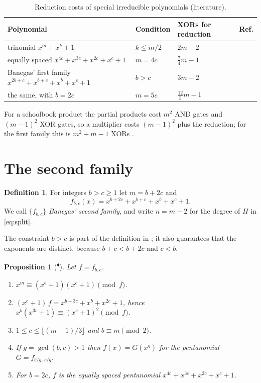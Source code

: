 \documentclass[11pt,a4paper]{article}
\theoremstyle{plain}
\newtheorem{proposition}[theorem]{Proposition}
\theoremstyle{definition}
\newtheorem{definition}[theorem]{Definition}
\newcommand{\ours}{\textsuperscript{\textcolor{cblue}{$\blacklozenge$}}}
\begin{document}
\begin{table}[t]
\centering\small
\caption{Reduction costs of special irreducible polynomials (literature).}
\label{tab:known}
\begin{tabular}{@{}l l l l@{}}
\toprule
Polynomial & Condition & XORs for reduction & Ref.\\
\midrule
trinomial $x^m+x^k+1$ & $k\le m/2$ & $2m-2$ & \cite{SunarKoc1999,Wu2002}\\
equally spaced $x^{4c}+x^{3c}+x^{2c}+x^c+1$ & $m=4c$ & $\tfrac74m-1$ & \cite{HasanWangBhargava1992,Banegas2015}\\
Banegas' first family $x^{2b+c}+x^{b+c}+x^b+x^c+1$ & $b>c$ & $3m-2$ & \cite{BCP2019}\\
\quad the same, with $b=2c$ & $m=5c$ & $\tfrac{12}{5}m-1$ & \cite{BCP2019}\\
\bottomrule
\end{tabular}
\end{table}

For a schoolbook product the partial products cost $m^2$ AND gates and $(m-1)^2$ XOR
gates, so a multiplier costs $(m-1)^2$ plus the reduction; for the first family this is
$m^2+m-1$ XORs \cite{BCP2019}.

\section{The second family}\label{sec:family}

\begin{definition}\label{def:family}
For integers $b>c\ge1$ let $m=b+2c$ and
\[
  f_{b,c}(x)=x^{b+2c}+x^{b+c}+x^b+x^c+1 .
\]
We call $\{f_{b,c}\}$ \emph{Banegas' second family}, and write $n=m-2$ for the degree of
$H$ in \eqref{eq:split}.
\end{definition}

The constraint $b>c$ is part of the definition in \cite{Banegas2015}; it also guarantees
that the exponents are distinct, because $b+c<b+2c$ and $c<b$.

\begin{proposition}[\ours]\label{prop:basic}
Let $f=f_{b,c}$.
\begin{enumerate}[label=(\roman*),itemsep=1pt]
  \item $x^m\equiv(x^b+1)(x^c+1)\pmod f$.
  \item $(x^c+1)\,f=x^{b+3c}+x^b+x^{2c}+1$, hence $x^b(x^{3c}+1)\equiv(x^c+1)^2\pmod f$.
  \item $1\le c\le\lfloor (m-1)/3\rfloor$ and $b\equiv m\pmod 2$.
  \item If $g=\gcd(b,c)>1$ then $f(x)=G(x^g)$ for the pentanomial $G=f_{b/g,\,c/g}$.
  \item For $b=2c$, $f$ is the equally spaced pentanomial $x^{4c}+x^{3c}+x^{2c}+x^c+1$.
\end{enumerate}
\end{proposition}
\end{document}
